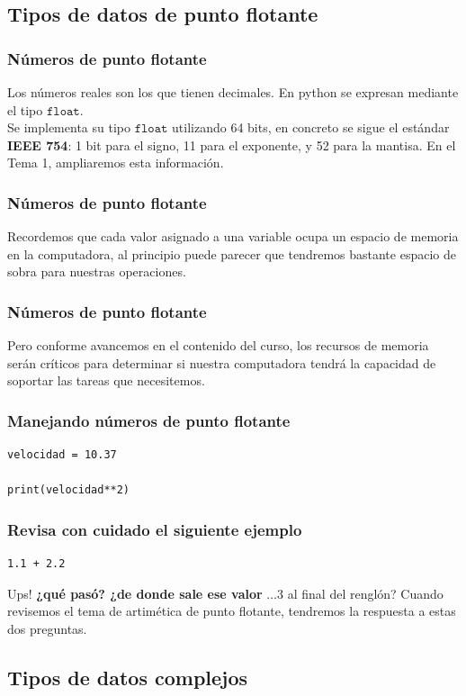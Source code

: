 \documentclass[12pt]{beamer}
\begin{document}
\subsection{Tipos de datos de punto flotante}

\begin{frame}
\frametitle{Números de punto flotante}
Los números reales son los que tienen decimales. En python se expresan mediante el tipo $\texttt{float}$.
\\
\bigskip
\pause
Se implementa su tipo $\texttt{float}$ utilizando 64 bits, en concreto se sigue el estándar \textbf{IEEE 754}: 1 bit para el signo, 11 para el exponente, y 52 para la mantisa. En el Tema 1, ampliaremos esta información.
\end{frame}
\begin{frame}
\frametitle{Números de punto flotante}
Recordemos que cada valor asignado a una variable ocupa un espacio de memoria en la computadora, \pause al principio puede parecer que tendremos bastante espacio de sobra para nuestras operaciones.
\end{frame}
\begin{frame}
\frametitle{Números de punto flotante}
Pero conforme avancemos en el contenido del curso, los recursos de memoria serán críticos para determinar si nuestra computadora tendrá la capacidad de soportar las tareas que necesitemos.
\end{frame}
\begin{frame}[fragile]
\frametitle{Manejando números de punto flotante}
\begin{lstlisting}[caption=Ejemplo con datos de punto flotante]
velocidad = 10.37

print(velocidad**2)
\end{lstlisting}
\end{frame}
\begin{frame}[fragile]
\frametitle{Revisa con cuidado el siguiente ejemplo}
\begin{lstlisting}[caption=Escribe y ejecute el siguiente código]
1.1 + 2.2
\end{lstlisting}
\pause
Ups! \textbf{¿qué pasó? ¿de donde sale ese valor} $\ldots 3$ al final del renglón? \pause Cuando revisemos el tema de artimética de punto flotante, tendremos la respuesta a estas dos preguntas.
\end{frame}

\subsection{Tipos de datos complejos}
\end{document}
